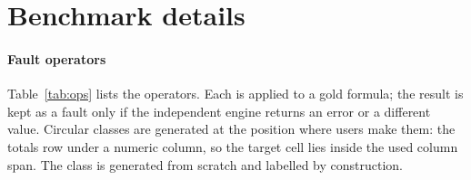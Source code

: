 \makeatletter\renewcommand{\fps@table}{!htb}\makeatother

\section{Benchmark details}
\label{app:bench}

\paragraph{Fault operators}
Table~\ref{tab:ops} lists the operators. Each is applied to a gold formula; the result is kept as a fault only if the independent engine returns an error or a different value. Circular classes are generated at the position where users make them: the totals row under a numeric column, so the target cell lies inside the used column span. The  class is generated from scratch and labelled by construction.

